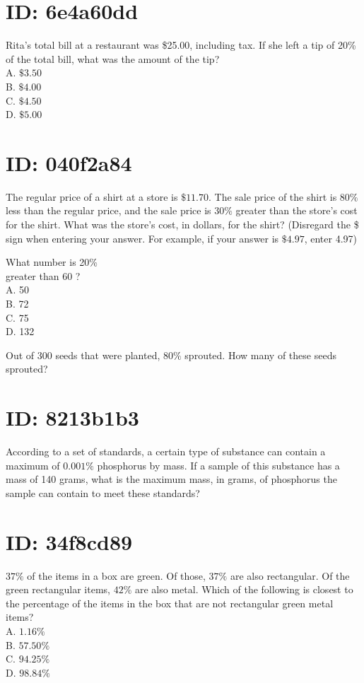 \section*{ID: 6e4a60dd}
Rita's total bill at a restaurant was \$25.00, including tax. If she left a tip of 20\% of the total bill, what was the amount of the tip?\\
A. $\$ 3.50$\\
B. $\$ 4.00$\\
C. $\$ 4.50$\\
D. $\$ 5.00$

\section*{ID: 040f2a84}
The regular price of a shirt at a store is $\$ 11.70$. The sale price of the shirt is $80 \%$ less than the regular price, and the sale price is $30 \%$ greater than the store's cost for the shirt. What was the store's cost, in dollars, for the shirt? (Disregard the \$ sign when entering your answer. For example, if your answer is $\$ 4.97$, enter 4.97)

What number is 20\%\\
greater than 60 ?\\
A. 50\\
B. 72\\
C. 75\\
D. 132

Out of 300 seeds that were planted, $80 \%$ sprouted. How many of these seeds sprouted?

\section*{ID: 8213b1b3}
According to a set of standards, a certain type of substance can contain a maximum of $0.001 \%$ phosphorus by mass. If a sample of this substance has a mass of 140 grams, what is the maximum mass, in grams, of phosphorus the sample can contain to meet these standards?

\section*{ID: 34f8cd89}
$37 \%$ of the items in a box are green. Of those, $37 \%$ are also rectangular. Of the green rectangular items, $42 \%$ are also metal. Which of the following is closest to the percentage of the items in the box that are not rectangular green metal items?\\
A. $1.16 \%$\\
B. $57.50 \%$\\
C. $94.25 \%$\\
D. $98.84 \%$

